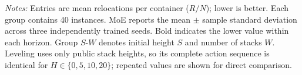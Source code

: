 \begin{table}[t]
{\begin{tabular}{lrrrrrrrrr}
    \bottomrule
  \end{tabular}%
  }
  \vspace{2pt}
  \parbox{\linewidth}{\footnotesize \textit{Notes:} Entries are mean relocations per container ($R/N$); lower is better. Each group contains 40 instances. MoE reports the mean $\pm$ sample standard deviation across three independently trained seeds. Bold indicates the lower value within each horizon. Group $S$-$W$ denotes initial height $S$ and number of stacks $W$. Leveling uses only public stack heights, so its complete action sequence is identical for $H\in\{0,5,10,20\}$; repeated values are shown for direct comparison.}
\end{table}
